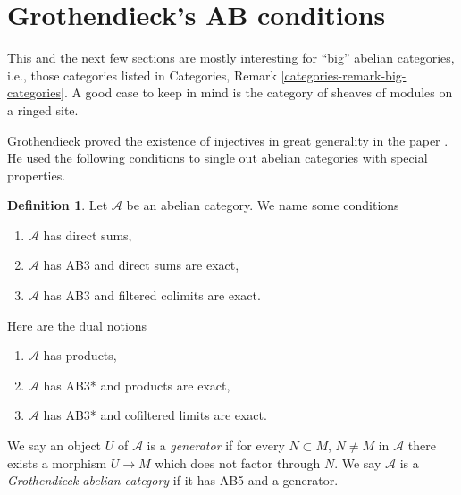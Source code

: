 \documentclass{stacks-project}
\theoremstyle{plain}
\theoremstyle{definition}
\newtheorem{definition}[subsection]{Definition}
\theoremstyle{remark}
\numberwithin{equation}{subsection}
\begin{document}
\section{Grothendieck's AB conditions}
\label{section-grothendieck-conditions}

\noindent
This and the next few sections are mostly interesting for ``big'' abelian
categories, i.e., those categories listed in
Categories, Remark \ref{categories-remark-big-categories}.
A good case to keep in mind is the category of sheaves of modules
on a ringed site.

\medskip\noindent
Grothendieck proved the existence of injectives in great generality
in the paper \cite{Tohoku}. He used the following conditions to single
out abelian categories with special properties.

\begin{definition}
\label{definition-grothendieck-conditions}
Let $\mathcal{A}$ be an abelian category. We name some conditions
\begin{enumerate}
\item[AB3] $\mathcal{A}$ has direct sums,
\item[AB4] $\mathcal{A}$ has AB3 and direct sums are exact,
\item[AB5] $\mathcal{A}$ has AB3 and filtered colimits are exact.
\end{enumerate}
Here are the dual notions
\begin{enumerate}
\item[AB3*] $\mathcal{A}$ has products,
\item[AB4*] $\mathcal{A}$ has AB3* and products are exact,
\item[AB5*] $\mathcal{A}$ has AB3* and cofiltered limits are exact.
\end{enumerate}
We say an object $U$ of $\mathcal{A}$ is a {\it generator} if
for every $N \subset M$, $N \not = M$ in $\mathcal{A}$ there exists a morphism
$U \to M$ which does not factor through $N$.
We say $\mathcal{A}$ is a {\it Grothendieck abelian category} if
it has AB5 and a generator.
\end{definition}
\end{document}
